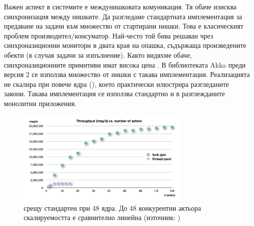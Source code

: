 Важен аспект в системите е междунишковата комуникация. Тя обаче изисква синхронизация между нишките. Да разгледаме стандартната имплементация за предаване на задачи към множество от стартирани нишки. Това е класическият проблем производител/консуматор. Най-често той бива решаван чрез синхроназиционни монитори в двата края на опашка, съдържаща произведените обекти (в случая задачи за изпълнение). Както видяхме обаче, синхроназиционните примитиви имат висока цена \cite{thompson2011Disruptor}. В библиотеката Akka преди версия 2 се използва множество от нишки с такава имплементация. Реализацията не скалира при повече ядра (), което практически илюстрира разгледаните закони. Такава имплементация се използва стандартно и в разглежданите монолитни приложения.

\begin{figure}
  \centering\includegraphics[width=0.75\textwidth]{images/fork-join-vs-thread-pool.png}
  \caption[ срещу стандартен  при 48 ядра]{ срещу стандартен  при 48 ядра. До 48 конкурентни актьора скалируемостта е сравнително линейна (източник: \cite{nordwall2012ForkJoin})}
  \label{fig:fork-join-vs-thread-pool}
\end{figure}

